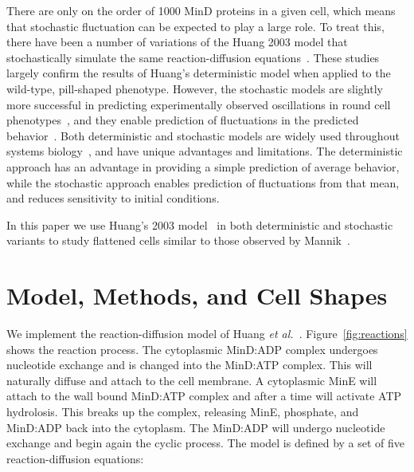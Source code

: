 \documentclass{pnastwo}
\begin{document}
\begin{article}
There are only on the order of 1000 MinD proteins in a given cell,
which means that stochastic fluctuation can be expected to play a
large role.  To treat this, there have been a number of variations of
the Huang 2003 model that stochastically simulate the same
reaction-diffusion equations~\cite{fange2006noise, kerr2006division}.
These studies largely confirm the results of Huang's deterministic
model when applied to the wild-type, pill-shaped phenotype.  However,
the stochastic models are slightly more successful in predicting
experimentally observed oscillations in round cell
phenotypes~\cite{fange2006noise, huang2004min}, and they enable
prediction of fluctuations in the predicted
behavior~\cite{kruse2007experimentalist}.  Both deterministic and
stochastic models are widely used throughout systems
biology~\cite{lawson2013spatial, robb2014stochastic,
  oguz2014stochastic, fu2013deterministic, rudiger2014stochastic}, and
have unique advantages and limitations.  The deterministic approach
has an advantage in providing a simple prediction of average behavior,
while the stochastic approach enables prediction of fluctuations from
that mean, and reduces sensitivity to initial conditions.

In this paper we use Huang's 2003 model~\cite{huang2003dynamic} in
both deterministic and stochastic variants to study flattened cells
similar to those observed by Mannik~\cite{mannik2009bacterial}.



\section{Model, Methods, and Cell Shapes}\label{sec:model-method-shapes}
We implement the reaction-diffusion model of Huang \emph{et
  al.}~\cite{huang2003dynamic}.  Figure~\ref{fig:reactions} shows the
reaction process.  The cytoplasmic MinD:ADP complex undergoes
nucleotide exchange and is changed into the MinD:ATP complex.  This
will naturally diffuse and attach to the cell membrane.  A cytoplasmic
MinE will attach to the wall bound MinD:ATP complex and after a time
will activate ATP hydrolosis.  This breaks up the complex, releasing
MinE, phosphate, and MinD:ADP back into the cytoplasm.  The MinD:ADP
will undergo nucleotide exchange and begin again the cyclic process.
The model is defined by a set of five reaction-diffusion equations:


\end{article}
\end{document}
